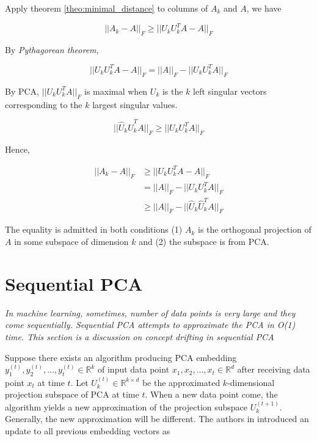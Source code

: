 \documentclass{article}
\begin{document}
Apply theorem \ref{theo:minimal_distance} to columns of $A_k$ and $A$, we have

\begin{equation}
    ||A_k - A||_F \geq ||U_k U_k^T A - A||_F
\end{equation}

By \emph{Pythagorean theorem},

\begin{equation}
    ||U_k U_k^T A - A||_F = ||A||_F - ||U_k U_k^T A||_F
\end{equation}

By PCA, $||U_k U_k^T A||_F$ is maximal when $U_k$ is the $k$ left singular vectors corresponding to the $k$ largest singular values.

\begin{equation}
    ||\hat{U}_k \hat{U}_k^T A||_F \geq ||U_k U_k^T A||_F
\end{equation}

Hence,

\begin{equation}
\begin{split}
    ||A_k - A||_F   &\geq ||U_k U_k^T A - A||_F \\
                    &= ||A||_F - ||U_k U_k^T A||_F \\
                    &\geq ||A||_F - ||\hat{U}_k \hat{U}_k^T A||_F
\end{split}     
\end{equation}

The equality is admitted in both conditions (1) $A_k$ is the orthogonal projection of $A$ in some subspace of dimension $k$ and (2) the subspace is from PCA.

\section{Sequential PCA}

\emph{In machine learning, sometimes, number of data points is very large and they come sequentially. Sequential PCA attempts to approximate the PCA in O(1) time. This section is a discussion on concept drifting in sequential PCA}

Suppose there exists an algorithm producing PCA embedding $y_1^{(t)}, y_2^{(t)}, ..., y_t^{(t)} \in \mathbb{R}^k$ of input data point $x_1, x_2, ..., x_t \in \mathbb{R}^d$ after receiving data point $x_t$ at time $t$. Let $U_k^{(t)} \in \mathbb{R}^{k \times d}$ be the approximated $k$-dimensional projection subspace of PCA at time $t$. When a new data point come, the algorithm yields a new approximation of the projection subspace $U_k^{(t+1)}$. Generally, the new approximation will be different. The authors in \cite{7498277} introduced an update to all previous embedding vectors as
\end{document}
